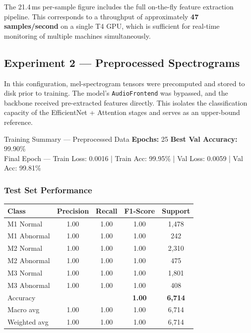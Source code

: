 \documentclass[12pt,a4paper]{article}
\begin{document}
The 21.4\,ms per-sample figure includes the full on-the-fly feature extraction pipeline. This corresponds to a throughput of approximately \textbf{47 samples/second} on a single T4 GPU, which is sufficient for real-time monitoring of multiple machines simultaneously.

\subsection{Experiment 2 — Preprocessed Spectrograms}

In this configuration, mel-spectrogram tensors were precomputed and stored to disk prior to training. The model's \texttt{AudioFrontend} was bypassed, and the backbone received pre-extracted features directly. This isolates the classification capacity of the EfficientNet + Attention stages and serves as an upper-bound reference.

\begin{resultbox}{Training Summary — Preprocessed Data}
  \textbf{Epochs:} 25 \quad
  \textbf{Best Val Accuracy:} 99.90\% \\[4pt]
  Final Epoch — Train Loss: 0.0016 \;|\; Train Acc: 99.95\% \;|\; Val Loss: 0.0059 \;|\; Val Acc: 99.81\%
\end{resultbox}

\subsubsection{Test Set Performance}

\begin{center}
\renewcommand{\arraystretch}{1.3}
\begin{tabular}{lcccc}
  \toprule
  \textbf{Class} & \textbf{Precision} & \textbf{Recall} & \textbf{F1-Score} & \textbf{Support} \\
  \midrule
  M1 Normal   & 1.00 & 1.00 & 1.00 & 1{,}478 \\
  M1 Abnormal & 1.00 & 1.00 & 1.00 &   242   \\
  M2 Normal   & 1.00 & 1.00 & 1.00 & 2{,}310 \\
  M2 Abnormal & 1.00 & 1.00 & 1.00 &   475   \\
  M3 Normal   & 1.00 & 1.00 & 1.00 & 1{,}801 \\
  M3 Abnormal & 1.00 & 1.00 & 1.00 &   408   \\
  \midrule
  Accuracy    &      &      & \textbf{1.00} & \textbf{6{,}714} \\
  Macro avg   & 1.00 & 1.00 & 1.00 & 6{,}714 \\
  Weighted avg& 1.00 & 1.00 & 1.00 & 6{,}714 \\
  \bottomrule
\end{tabular}
\end{center}
\end{document}

